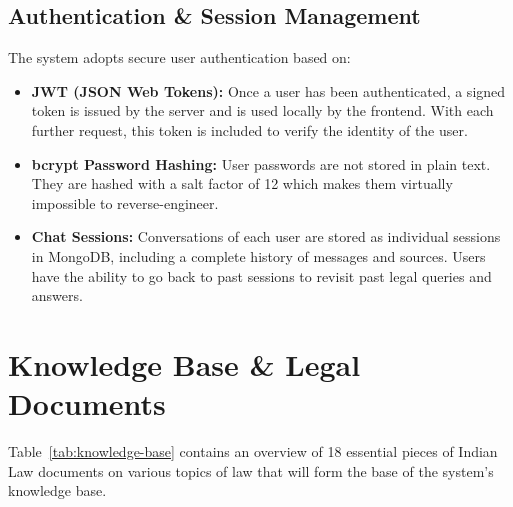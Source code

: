 \documentclass[12pt,a4paper]{article}
\begin{document}
\subsection{Authentication \& Session Management}

The system adopts secure user authentication based on:

\begin{itemize}
  \item \textbf{JWT (JSON Web Tokens):} Once a user has been authenticated, a signed token is issued by the server and is used locally by the frontend. With each further request, this token is included to verify the identity of the user.
  \item \textbf{bcrypt Password Hashing:} User passwords are not stored in plain text. They are hashed with a salt factor of 12 which makes them virtually impossible to reverse-engineer.

  \item \textbf{Chat Sessions:} Conversations of each user are stored as individual sessions in MongoDB, including a complete history of messages and sources. Users have the ability to go back to past sessions to revisit past legal queries and answers.
\end{itemize}

\section{Knowledge Base \& Legal Documents}

Table~\ref{tab:knowledge-base} contains an overview of 18 essential pieces of Indian Law documents on various topics of law that will form the base of the system's knowledge base.
\end{document}
